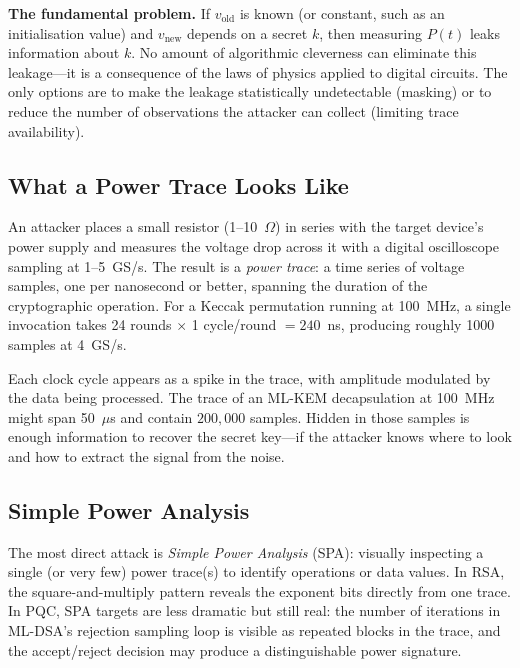\begin{svgraybox}
\textbf{The fundamental problem.}  If $v_{\text{old}}$ is known (or constant, such as an initialisation value) and $v_{\text{new}}$ depends on a secret $k$, then measuring $P(t)$ leaks information about $k$.  No amount of algorithmic cleverness can eliminate this leakage---it is a consequence of the laws of physics applied to digital circuits.  The only options are to make the leakage statistically undetectable (masking) or to reduce the number of observations the attacker can collect (limiting trace availability).
\end{svgraybox}


\subsection{What a Power Trace Looks Like}
\label{subsec:power-trace}

An attacker places a small resistor (1--10~$\Omega$) in series with the target device's power supply and measures the voltage drop across it with a digital oscilloscope sampling at 1--5~GS/s.  The result is a \emph{power trace}: a time series of voltage samples, one per nanosecond or better, spanning the duration of the cryptographic operation.  For a Keccak permutation running at 100~MHz, a single invocation takes 24 rounds $\times$ 1 cycle/round $= 240$~ns, producing roughly 1000 samples at 4~GS/s.

Each clock cycle appears as a spike in the trace, with amplitude modulated by the data being processed.  The trace of an ML-KEM decapsulation at 100~MHz might span 50~$\mu$s and contain $200{,}000$ samples.  Hidden in those samples is enough information to recover the secret key---if the attacker knows where to look and how to extract the signal from the noise.


\subsection{Simple Power Analysis}
\label{subsec:spa}

The most direct attack is \emph{Simple Power Analysis} (SPA): visually inspecting a single (or very few) power trace(s) to identify operations or data values.  In RSA, the square-and-multiply pattern reveals the exponent bits directly from one trace.  In PQC, SPA targets are less dramatic but still real: the number of iterations in ML-DSA's rejection sampling loop is visible as repeated blocks in the trace, and the accept/reject decision may produce a distinguishable power signature.

